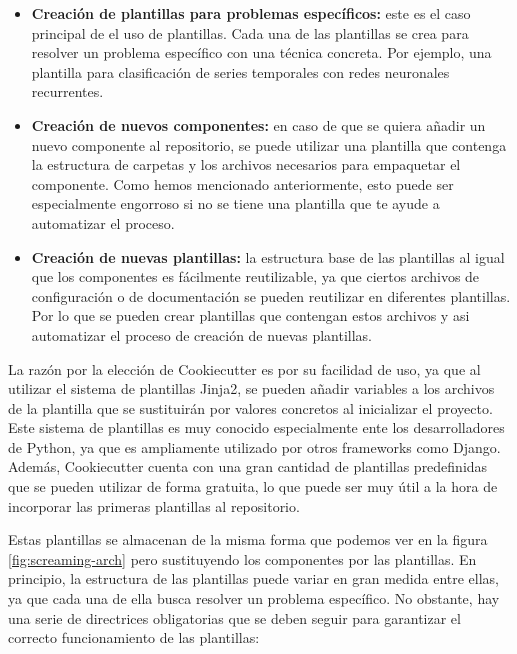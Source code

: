 \begin{itemize}
    \item \textbf{Creación de plantillas para problemas específicos:} este es el caso
    principal de el uso de plantillas. Cada una de las plantillas se crea para resolver
    un problema específico con una técnica concreta. Por ejemplo, una plantilla para
    clasificación de series temporales con redes neuronales recurrentes.
    \item \textbf{Creación de nuevos componentes:} en caso de que se quiera añadir
    un nuevo componente al repositorio, se puede utilizar una plantilla que contenga
    la estructura de carpetas y los archivos necesarios para empaquetar el componente.
    Como hemos mencionado anteriormente, esto puede ser especialmente engorroso si no
    se tiene una plantilla que te ayude a automatizar el proceso.
    \item \textbf{Creación de nuevas plantillas:} la estructura base de las plantillas
    al igual que los componentes es fácilmente reutilizable, ya que ciertos archivos de
    configuración o de documentación se pueden reutilizar en diferentes plantillas. Por
    lo que se pueden crear plantillas que contengan estos archivos y asi automatizar el
    proceso de creación de nuevas plantillas. 
\end{itemize}

La razón por la elección de Cookiecutter es por su facilidad de uso, ya que
al utilizar el sistema de plantillas Jinja2, se pueden añadir variables a los
archivos de la plantilla que se sustituirán por valores concretos al inicializar
el proyecto. Este sistema de plantillas es muy conocido especialmente ente los
desarrolladores de Python, ya que es ampliamente utilizado por otros frameworks
como Django. Además, Cookiecutter cuenta con una gran cantidad de plantillas
predefinidas que se pueden utilizar de forma gratuita, lo que puede ser muy útil
a la hora de incorporar las primeras plantillas al repositorio.\medskip

Estas plantillas se almacenan de la misma forma que podemos ver en la figura
\ref{fig:screaming-arch} pero sustituyendo los componentes por las plantillas.
En principio, la estructura de las plantillas puede variar en gran medida entre
ellas, ya que cada una de ella busca resolver un problema específico. No obstante,
hay una serie de directrices obligatorias que se deben seguir para garantizar el
correcto funcionamiento de las plantillas:

